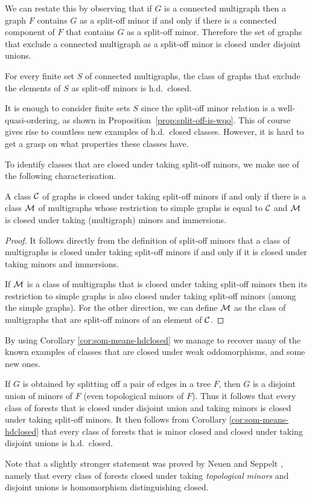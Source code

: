 \documentclass[11pt]{article}
\begin{document}
We can restate this by observing that if $G$ is a connected multigraph then a graph $F$ contains $G$ as a split-off minor if and only if there is a connected component of $F$ that contains $G$ as a split-off minor. Therefore the set of graphs that exclude a connected multigraph as a split-off minor is closed under disjoint unions.
\begin{corollary}
\label{cor:thm6wqo-variant}
    For every finite set $S$ of connected multigraphs, the class of graphs that exclude the elements of $S$ as split-off minors is h.d.\ closed.
\end{corollary}
It is enough to consider finite sets $S$ since the split-off minor relation is a well-quasi-ordering, as shown in Proposition~\ref{prop:split-off-is-wqo}.
This of course gives rise to countless new examples of h.d.\ closed classes. However, it is hard to get a grasp on what properties these classes have.
\par 


To identify classes that are closed under taking split-off minors, we make use of the following characterisation.

\begin{proposition}
\label{prop:split-off-closure}
    A class $\mathcal{C}$ of graphs is closed under taking split-off minors if and only if there is a class $\mathcal{M}$ of multigraphs whose restriction to simple graphs is equal to $\mathcal{C}$ and $\mathcal{M}$ is closed under taking (multigraph) minors and immersions.
\end{proposition}
\begin{proof}
    It follows directly from the definition of split-off minors that a class of multigraphs is closed under taking split-off minors if and only if it is closed under taking minors and immersions. \par 
    If $\mathcal{M}$ is a class of multigraphs that is closed under taking split-off minors then its restriction to simple graphs is also closed under taking split-off minors (among the simple graphs). For the other direction, we can define $\mathcal{M}$ as the class of multigraphs that are split-off minors of an element of $\mathcal{C}$.
\end{proof}

By using Corollary \ref{cor:som-means-hdclosed} we manage to recover many of the known examples of classes that are closed under weak oddomorphisms, and some new ones.
\begin{example}
    If $G$ is obtained by splitting off a pair of edges in a tree $F$, then $G$ is a disjoint union of minors of $F$ (even topological minors of $F$). Thus it follows that every class of forests that is closed under disjoint union and taking minors is closed under taking split-off minors. It then follows from Corollary \ref{cor:som-means-hdclosed} that every class of forests that is minor closed and closed under taking disjoint unions is h.d.\ closed.
\end{example}
Note that a slightly stronger statement was proved by Neuen and Seppelt \cite{neuen2026distinguishinggraphscountinghomomorphisms}, namely that every class of forests closed under taking \emph{topological minors} and disjoint unions is homomorphism distinguishing closed.
\end{document}
